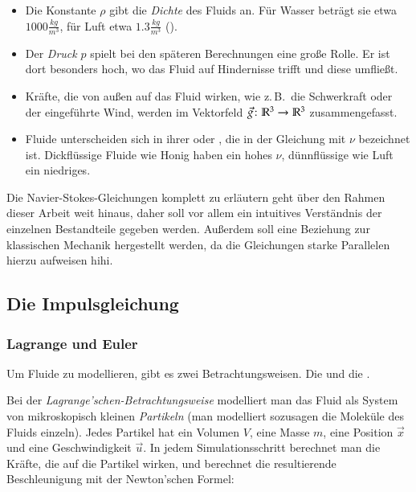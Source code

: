 \begin{itemize}
\item
	Die Konstante $\rho$ gibt die \emph{Dichte} des Fluids an. Für Wasser beträgt
	sie etwa $1000 \frac{kg}{m^3}$, für Luft etwa $1.3 \frac{kg}{m^3}$ (\cite{Bridson2007}).
\item
	Der \emph{Druck} $p$ spielt bei den späteren Berechnungen eine große Rolle.
	Er ist dort besonders hoch, wo das Fluid auf Hindernisse
        trifft und diese umfließt.
\item
	Kräfte, die von außen auf das Fluid wirken, wie z.\,B.\ die Schwerkraft
	oder der eingeführte Wind, werden im Vektorfeld $\vec{g} \colon
	\mathbb{R}^3 \to \mathbb{R}^3$ zusammengefasst.
\item
	Fluide unterscheiden sich in ihrer 
	oder , die in der Gleichung mit $\nu$
	bezeichnet ist. Dickflüssige Fluide wie Honig haben ein hohes $\nu$,
	dünnflüssige wie Luft ein niedriges.
\end{itemize}

Die Navier-Stokes-Gleichungen komplett zu erläutern geht über den Rahmen dieser
Arbeit weit hinaus, daher soll vor allem ein intuitives Verständnis der
einzelnen Bestandteile gegeben werden. Außerdem soll eine Beziehung zur
klassischen Mechanik hergestellt werden, da die Gleichungen starke Parallelen
hierzu aufweisen hihi.

\subsection{Die Impulsgleichung}

\subsubsection{Lagrange und Euler}

Um Fluide zu modellieren, gibt es zwei Betrachtungsweisen. Die
 und die
.

Bei der \emph{Lagrange'schen-Betrachtungsweise} modelliert man das
Fluid als System von mikroskopisch kleinen \emph{Partikeln} (man
modelliert sozusagen die Moleküle des Fluids einzeln). Jedes Partikel
hat ein Volumen $V$, eine Masse $m$, eine Position $\vec{x}$ und eine
Geschwindigkeit $\vec{u}$. In jedem Simulationsschritt berechnet man
die Kräfte, die auf die Partikel wirken, und berechnet die
resultierende Beschleunigung mit der Newton'schen Formel:


